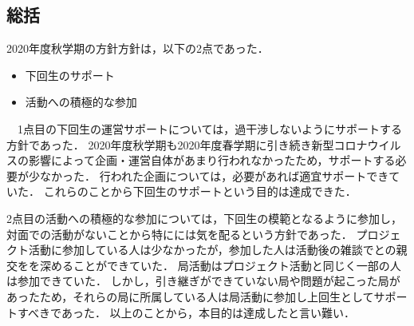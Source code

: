 \subsection*{\thirdGrade{}総括}


2020年度秋学期の\thirdGrade{}方針方針は，以下の2点であった．
\begin{itemize}
  \item 下回生のサポート
  \item 活動への積極的な参加
\end{itemize}
　1点目の下回生の運営サポートについては，過干渉しないようにサポートする方針であった．
2020年度秋学期も2020年度春学期に引き続き新型コロナウイルスの影響によって企画・運営自体があまり行われなかったため，サポートする必要が少なかった．
行われた企画については，必要があれば適宜サポートできていた．
これらのことから下回生のサポートという目的は達成できた．

2点目の活動への積極的な参加については，下回生の模範となるように参加し，対面での活動がないことから特に\firstGrade{}には気を配るという方針であった．
プロジェクト活動に参加している人は少なかったが，参加した人は活動後の雑談で\firstGrade{}との親交をを深めることができていた．
局活動はプロジェクト活動と同じく一部の人は参加できていた．
しかし，引き継ぎができていない局や問題が起こった局があったため，それらの局に所属している人は局活動に参加し上回生としてサポートすべきであった．
以上のことから，本目的は達成したと言い難い．
